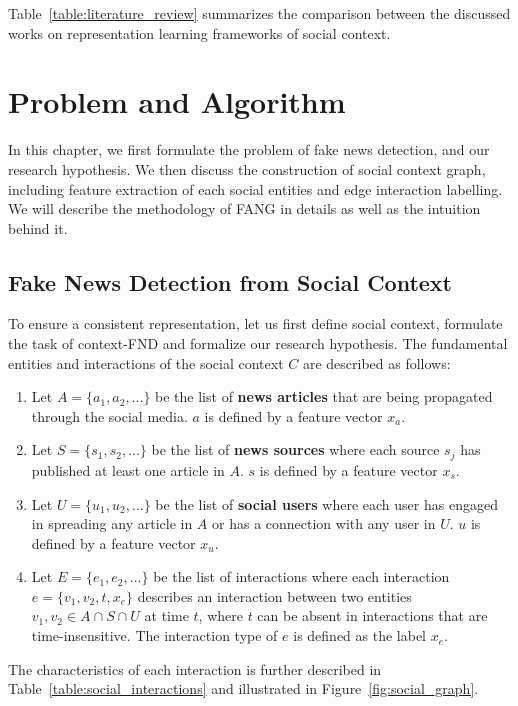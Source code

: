 \documentclass[fyp]{socreport}
\theoremstyle{definition}
\theoremstyle{hypothesis}
\begin{document}
Table~\ref{table:literature_review} summarizes the comparison between the discussed works on representation learning frameworks of social context. 

\chapter{Problem and Algorithm}
In this chapter, we first formulate the problem of fake news detection, and our research hypothesis. We then discuss the construction of social context graph, including feature extraction of each social entities and edge interaction labelling. We will describe the methodology of FANG in details as well as the intuition behind it.

\section{Fake News Detection from Social Context}
To ensure a consistent representation, let us first define social context, formulate the task of context-FND and formalize our research hypothesis. The fundamental entities and interactions of the social context $C$ are described as follows: 
\begin{enumerate}
    \item Let $A=\{a_1, a_2,...\}$ be the list of \textbf{news articles} that are being propagated through the social media. $a$ is defined by a feature vector $x_{a}$.
    \item Let $S=\{s_1, s_2,...\}$ be the list of \textbf{news sources} where each source $s_j$ has published at least one article in $A$. $s$ is defined by a feature vector $x_{s}$.
    \item Let $U=\{u_1, u_2,...\}$ be the list of \textbf{social users} where each user has engaged in spreading any article in $A$ or has a connection with any user in $U$. $u$ is defined by a feature vector $x_{u}$.
    \item Let $E=\{e_1, e_2,...\}$ be the list of interactions where each interaction $e=\{v_1, v_2, t, x_e\}$ describes an interaction between two entities $v_1, v_2\in A\cap S\cap U$ at time $t$, where $t$ can be absent in interactions that are time-insensitive. The interaction type of $e$ is defined as the label $x_{e}$.
\end{enumerate}
The characteristics of each interaction is further described in Table~\ref{table:social_interactions} and illustrated in Figure~\ref{fig:social_graph}.
\end{document}
